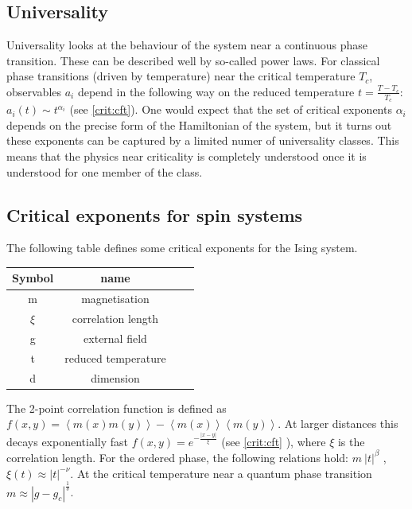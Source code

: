 \subsection{Universality}

Universality looks at the behaviour of the system near a continuous phase transition. These can be described well by so-called power laws. For classical phase transitions (driven by temperature) near the critical temperature $T_c$, observables $a_i$ depend in the following way on the reduced temperature $t=\frac{T-T_c}{T_c}$: $ a_i(t) \sim t^{\alpha_i}$ (see \cref{crit:cft}). One would expect that the set of critical exponents ${\alpha_i}$ depends on the precise form of the Hamiltonian of the system, but it turns out these exponents can be captured by a limited numer of universality classes. This means that the physics near criticality is completely understood once it is understood for one member of the class.

\subsection{Critical exponents for spin systems}
The following table defines some critical exponents for the Ising system.

\begin{table}[h!]
    \centering
    \begin{tabular}{c c c c}
        Symbol & name                \\
        \hline
        m      & magnetisation       \\
        $\xi$  & correlation length  \\
        g      & external field      \\
        t      & reduced temperature \\
        d      & dimension           \\
    \end{tabular}
\end{table}

The 2-point correlation function is defined as $ f( x,y) =  \left < m(x) m(y) \right > -  \left<m(x) \right> \left<m(y) \right> $. At larger distances this decays exponentially fast $ f(  x,y ) = e^{ -\frac{ |x-y|}{ \xi} } $ (see \cref{crit:cft} ), where $\xi$ is the correlation length. For the ordered phase, the following relations hold: $m ~ |t|^{\beta} $ , $\xi(t) \approx |t|^{-\nu} $. At the critical temperature near a quantum phase transition  $ m \approx |g-g_c|^{\frac{1}{\delta}} $. 

